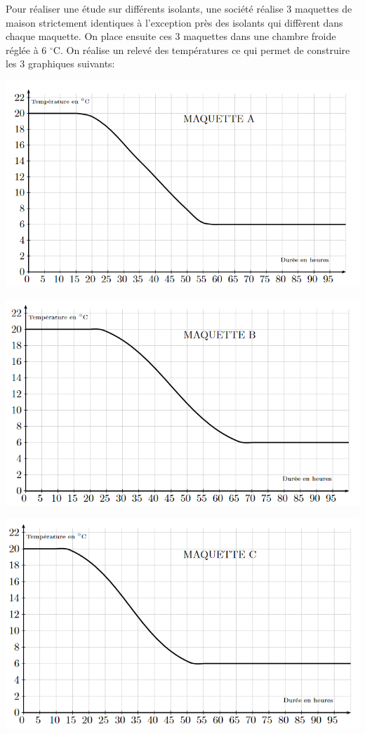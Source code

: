 
Pour réaliser une étude sur différents isolants, une société réalise 3 maquettes de maison strictement identiques à l'exception près des isolants qui diffèrent dans chaque maquette. On place ensuite ces 3 maquettes dans une chambre froide réglée à 6 $^\circ$C. On réalise un relevé des températures ce qui permet de construire les 3 graphiques suivants: 

\begin{minipage}{0.48\linewidth}
\includegraphics[scale=0.5]{NF-45-1.png} 
\end{minipage}
\hfill
\begin{minipage}{0.48\linewidth}
\includegraphics[scale=0.5]{NF-45-2.png} 
\end{minipage}

\begin{center}
\includegraphics[scale=0.5]{NF-45-3.png} 
\end{center}

